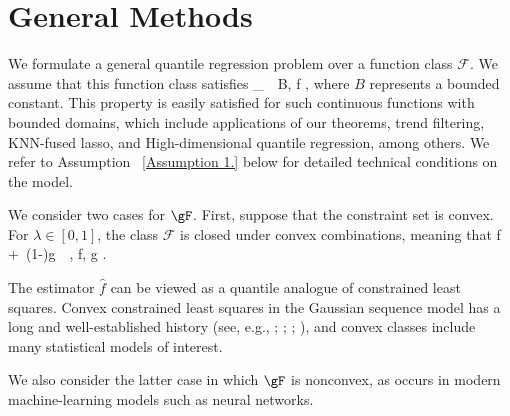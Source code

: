 \documentclass[twoside,11pt]{article}
\newcommand{\rev}[1]{{\color{revisionred}#1}}
\begin{document}
\section{General Methods}

\rev{We formulate a general quantile regression problem over a function class $\mathcal{F}$. We assume that this function class satisfies}
\beq 
\label{F_2}
_{\infty} \,\leq\, B, \quad \forall f \in {},
\beq
where $B$ represents a bounded constant. This property is easily satisfied for such continuous functions with bounded domains, which include applications of our theorems, trend filtering, KNN-fused lasso, and High-dimensional quantile regression, among others. We refer to Assumption ~\ref{Assumption 1.} below for detailed technical conditions on the model.

\rev{We consider two cases for $\gF$. First, suppose that the constraint set is convex. For $\lambda \in [0,1]$, the class $\mathcal{F}$ is closed under convex combinations, meaning that}
\beq
\label{F_1}
\lambda f \,+\, (1-\lambda)g \,\in\, , \quad \forall f, g \in {}.
\beq

\rev{The estimator \(\hat{f}\) can be viewed as a quantile analogue of constrained least squares. Convex constrained least squares in the Gaussian sequence model has a long and well-established history (see, e.g., \cite{van1990estimating}; \cite{van1996weak}; \cite{hjort2011asymptotics}; \cite{chatterjee2015risk}), and convex classes include many statistical models of interest.}

\rev{We also consider the latter case in which $\gF$ is nonconvex, as occurs in modern machine-learning models such as neural networks.}
\end{document}
